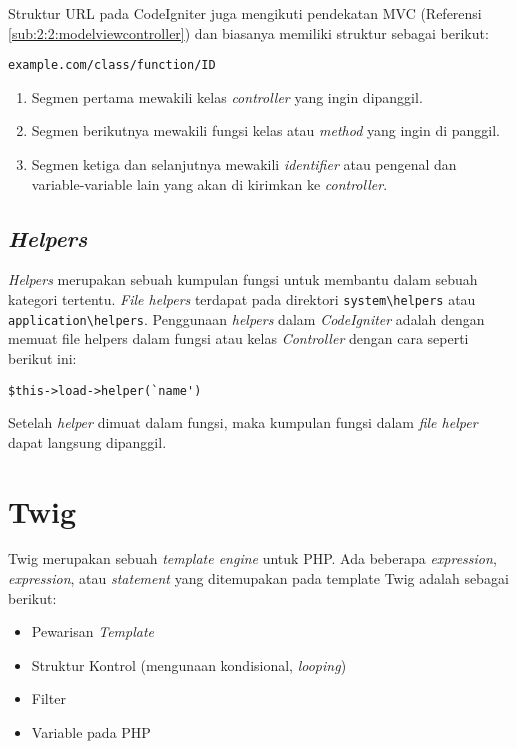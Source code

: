 Struktur URL pada CodeIgniter juga mengikuti pendekatan MVC (Referensi \ref{sub:2:2:modelviewcontroller}) dan biasanya memiliki struktur sebagai berikut:

\begin{center}
	\verb|example.com/class/function/ID|
\end{center}

\begin{enumerate}
	\item Segmen pertama mewakili kelas \textit{controller} yang ingin dipanggil.
	\item Segmen berikutnya mewakili fungsi kelas atau \textit{method} yang ingin di panggil.
	\item Segmen ketiga dan selanjutnya mewakili \textit{identifier} atau pengenal dan variable-variable lain yang akan di kirimkan ke \textit{controller}.
\end{enumerate}

\subsection{\textit{Helpers}}
\label{sub:2:2:helpers}

\textit{Helpers} merupakan sebuah kumpulan fungsi untuk membantu dalam sebuah kategori tertentu. \textit{File helpers} terdapat pada direktori \verb|system\helpers| atau \verb|application\helpers|. Penggunaan \textit{helpers} dalam \textit{CodeIgniter} adalah dengan memuat file helpers dalam fungsi atau kelas \textit{Controller} dengan cara seperti berikut ini:

\begin{center}
	\verb|$this->load->helper(`name')|
\end{center}

Setelah \textit{helper} dimuat dalam fungsi, maka kumpulan fungsi dalam \textit{file helper} dapat langsung dipanggil.

\section{Twig}
\label{sec:2:twig}

Twig merupakan sebuah \textit{template engine} untuk PHP. Ada beberapa \textit{expression}, \textit{expression}, atau \textit{statement} yang ditemupakan pada template Twig adalah sebagai berikut:
\begin{itemize}
	\item Pewarisan \textit{Template}
	\item Struktur Kontrol (mengunaan kondisional, \textit{looping})
	\item Filter
	\item Variable pada PHP
\end{itemize}

